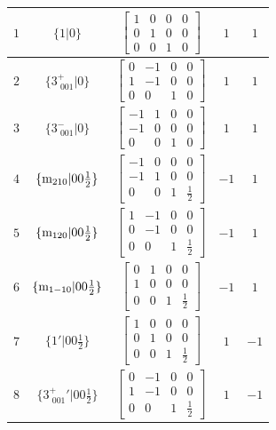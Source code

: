 \documentclass[fleqn,8pt]{jsarticle}
\begin{document}
\begin{longtable}{ccccc}
$ 1 $ & $ \{1|0\} $ & $ \begin{bmatrix} 1 & 0 & 0 & 0 \\ 0 & 1 & 0 & 0 \\ 0 & 0 & 1 & 0 \end{bmatrix} $ & $ 1 $ & $ 1 $ \\ \hline
$ 2 $ & $ \{3^{+}_{\,\,001}|0\} $ & $ \begin{bmatrix} 0 & -1 & 0 & 0 \\ 1 & -1 & 0 & 0 \\ 0 & 0 & 1 & 0 \end{bmatrix} $ & $ 1 $ & $ 1 $ \\ \hline
$ 3 $ & $ \{3^{-}_{\,\,001}|0\} $ & $ \begin{bmatrix} -1 & 1 & 0 & 0 \\ -1 & 0 & 0 & 0 \\ 0 & 0 & 1 & 0 \end{bmatrix} $ & $ 1 $ & $ 1 $ \\ \hline
$ 4 $ & $ \{{\rm m}_{210}|0 0 \frac{1}{2}\} $ & $ \begin{bmatrix} -1 & 0 & 0 & 0 \\ -1 & 1 & 0 & 0 \\ 0 & 0 & 1 & \frac{1}{2} \end{bmatrix} $ & $ -1 $ & $ 1 $ \\ \hline
$ 5 $ & $ \{{\rm m}_{120}|0 0 \frac{1}{2}\} $ & $ \begin{bmatrix} 1 & -1 & 0 & 0 \\ 0 & -1 & 0 & 0 \\ 0 & 0 & 1 & \frac{1}{2} \end{bmatrix} $ & $ -1 $ & $ 1 $ \\ \hline
$ 6 $ & $ \{{\rm m}_{1-10}|0 0 \frac{1}{2}\} $ & $ \begin{bmatrix} 0 & 1 & 0 & 0 \\ 1 & 0 & 0 & 0 \\ 0 & 0 & 1 & \frac{1}{2} \end{bmatrix} $ & $ -1 $ & $ 1 $ \\ \hline
$ 7 $ & $ \{1{}'|0 0 \frac{1}{2}\} $ & $ \begin{bmatrix} 1 & 0 & 0 & 0 \\ 0 & 1 & 0 & 0 \\ 0 & 0 & 1 & \frac{1}{2} \end{bmatrix} $ & $ 1 $ & $ -1 $ \\ \hline
$ 8 $ & $ \{3^{+}_{\,\,001}{}'|0 0 \frac{1}{2}\} $ & $ \begin{bmatrix} 0 & -1 & 0 & 0 \\ 1 & -1 & 0 & 0 \\ 0 & 0 & 1 & \frac{1}{2} \end{bmatrix} $ & $ 1 $ & $ -1 $ \\ \hline

\end{longtable}
\end{document}
